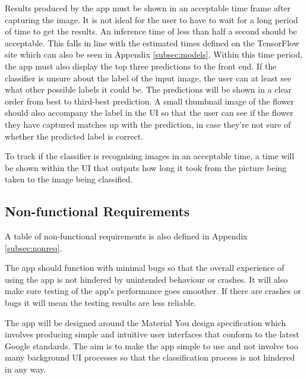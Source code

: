 \documentclass[12pt,a4paper]{report}
\begin{document}
\par

Results produced by the app must be shown in an acceptable time frame after capturing the image. It is not ideal for 
the user to have to wait for a long period of time to get the results. An inference time of less than 
half a second should be acceptable. This falls in line with the estimated times defined on the TensorFlow site which can also 
be seen in Appendix \ref{subsec:models}. Within this time period, the app must also display the top three predictions 
to the front end. 
If the classifier is unsure about the label of the input image, the user can at least see what other possible labels it 
could be. The predictions will be shown in a clear order from best to third-best prediction. A small thumbnail image of 
the flower should also accompany the label in the UI so that the user can see if the flower they have captured matches 
up with the prediction, in case they're not sure of whether the predicted label is correct. 

\par

To track if the classifier is recognising images in an acceptable time, a time will be shown within the UI that outputs 
how long it took from the picture being taken to the image being classified.

\subsection{Non-functional Requirements}

A table of non-functional requirements is also defined in Appendix \ref{subsec:nonreq}.

\par

The app should function with minimal bugs so that the overall experience of using the app is not hindered by unintended 
behaviour or crashes. It will also make sure testing of the app's performance goes smoother. If there are crashes or 
bugs it will mean the testing results are less reliable.

\par

The app will be designed around the Material You design specification which involves producing simple and intuitive user
interfaces that conform to the latest Google standards. The aim is to make the app simple to use and not involve too 
many background UI processes so that the classification process is not hindered in any way. 
\end{document}
